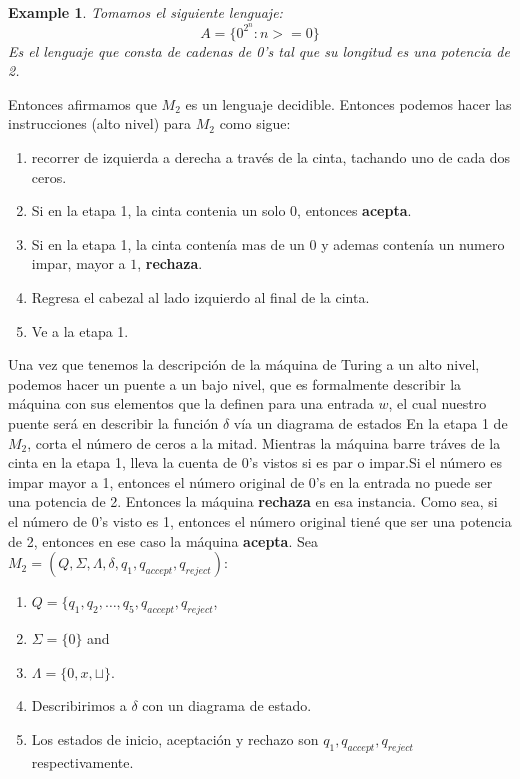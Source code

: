 \documentclass[10pt]{report}
\newtheorem{example}{Example}
\begin{document}
{    \begin{example}
        Tomamos el siguiente lenguaje:
        \begin{equation}
            A = \{ 0^2^n : n>=0\}\label{eq:equation2}
        \end{equation}
        Es el lenguaje que consta de cadenas de 0's tal que su longitud es una
        potencia de 2.
    \end{example}
    Entonces afirmamos que $M_{2}$ es un lenguaje decidible.
    Entonces podemos hacer las instrucciones (alto  nivel) para $M_{2}$ como sigue:
    \begin{enumerate}
        \item recorrer de izquierda a derecha a través de la cinta, tachando uno de cada dos ceros.
        \item Si en la etapa 1, la cinta contenia un solo $0$, entonces \textbf{acepta}.
        \item Si en la etapa 1, la cinta contenía mas de un $0$ y ademas contenía un numero impar, mayor a $1$, \textbf{rechaza}.
        \item Regresa el cabezal al lado izquierdo      al final de la cinta.
        \item Ve a la etapa 1.
    \end{enumerate}
    Una vez que tenemos la descripción de la máquina de Turing a un alto nivel, podemos hacer un puente
    a un bajo nivel, que es formalmente describir la máquina con sus elementos que la definen para una entrada $w$,
    el cual nuestro puente será en describir la función $\delta$ vía un diagrama de estados
    En la etapa 1 de $M_{2}$, corta el número de ceros a la mitad. Mientras la máquina barre tráves de la cinta en la
    etapa 1, lleva la cuenta de $0$'s vistos si es par o impar.\newline Si el número es impar mayor a 1, entonces el número original
    de $0$'s en la entrada no puede ser una potencia de 2. Entonces la máquina \textbf{rechaza} en esa instancia.
    Como sea, si el número de 0's visto es 1, entonces el número original tiené que ser una potencia de 2, entonces en ese
    caso la máquina \textbf{acepta}.
    Sea $M_{2} =(Q,\Sigma,\Lambda,\delta,q_{1},q_{accept},q_{reject})$:
    \begin{enumerate}
        \item $Q = \{q_{1},q_{2},\dots,q_{5},q_{accept},q_{reject}$,
        \item $\Sigma = \{ 0 \}$ and
        \item $\Lambda = \{0,x,\sqcup \}$.
        \item Describirimos a $\delta$ con un diagrama de estado.
        \item Los estados de inicio, aceptación y rechazo son $q_{1},q_{accept},q_{reject}$ respectivamente.
    \end{enumerate}
    \newline

}
\end{document}
